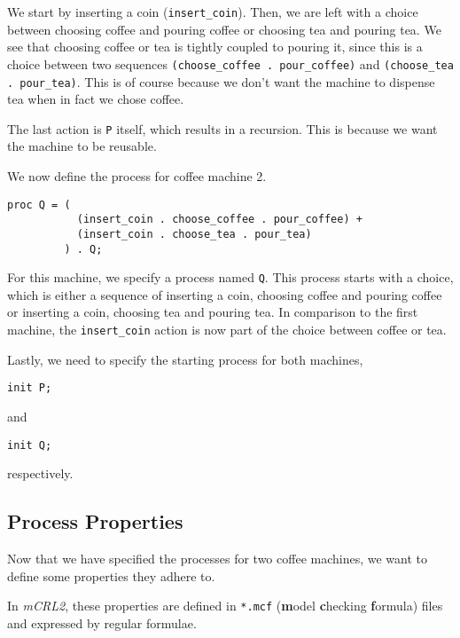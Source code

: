 \documentclass{clseminar}
\begin{document}
  We start by inserting a coin (\texttt{insert\_coin}). Then, we are left with a choice between choosing coffee and pouring coffee or choosing tea and pouring tea. We see that choosing coffee or tea is tightly coupled to pouring it, since this is a choice between two sequences \texttt{(choose\_coffee . pour\_coffee)} and \texttt{(choose\_tea . pour\_tea)}. This is of course because we don't want the machine to dispense tea when in fact we chose coffee.

  The last action is \texttt{P} itself, which results in a recursion. This is because we want the machine to be reusable.

  We now define the process for coffee machine 2.

  \begin{lstlisting}[language=mCRL2]
proc Q = (
           (insert_coin . choose_coffee . pour_coffee) +
           (insert_coin . choose_tea . pour_tea)
         ) . Q;
  \end{lstlisting}

  For this machine, we specify a process named \texttt{Q}. This process starts with a choice, which is either a sequence of inserting a coin, choosing coffee and pouring coffee or inserting a coin, choosing tea and pouring tea. In comparison to the first machine, the \texttt{insert\_coin} action is now part of the choice between coffee or tea.

  Lastly, we need to specify the starting process for both machines,

  \begin{lstlisting}[language=mCRL2]
init P;
  \end{lstlisting}

  and

  \begin{lstlisting}[language=mCRL2]
init Q;
  \end{lstlisting}

  respectively.

  \subsection{Process Properties}

  Now that we have specified the processes for two coffee machines, we want to define some properties they adhere to.

  In \textit{mCRL2}, these properties are defined in \texttt{*.mcf} (\textbf{m}odel \textbf{c}hecking \textbf{f}ormula) files and expressed by regular formulae.
\end{document}
